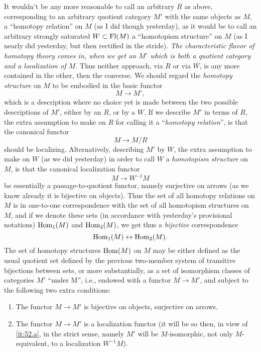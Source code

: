 It wouldn't be any more reasonable to call an arbitrary $R$ as above,
corresponding to an arbitrary quotient category $M'$ with the same
objects as $M$, a ``homotopy relation'' on $M$ (as I did though
yesterday), as it would be to call an arbitrary strongly saturated
$W\subset\operatorname{Fl}(M)$ a ``homotopism structure'' on $M$ (as I nearly did
yesterday, but then rectified in the stride). \emph{The characteristic
  flavor of homotopy theory comes in, when we get an $M'$ which is
  \emph{both} a quotient category and a localization of $M$.} Thus
neither approach, via $R$ or via $W$, is any more contained in the
other, then the converse. We should regard the \emph{homotopy
  structure} on $M$ to be embodied in the basic functor
\[M\to M',\]
which is a description where no choice yet is made between the two
possible descriptions of $M'$, either by an $R$, or by a $W$. If we
describe $M'$ in terms of $R$, the extra assumption to make on $R$ for
calling it a ``\emph{homotopy relation}'', is that the canonical
functor
\[ M \to M/R\]
should be localizing. Alternatively, describing $M'$ by $W$, the extra
assumption to make on $W$ (as we did yesterday) in order to call $W$ a
\emph{homotopism structure} on $M$, is that the canonical localization
functor
\[ M \to W^{-1}M\]
be essentially a passage-to-quotient functor, namely surjective on
arrows (as we know already it is bijective on objects). Thus the set
of all homotopy relations on $M$ is in one-to-one correspondence with
the set of all homotopism structures on $M$, and if we denote these
sets (in accordance with yesterday's provisional notations)
$\operatorname{Hom}_1(M)$ and $\operatorname{Hom}_2(M)$, we get thus a \emph{bijective}
correspondence
\[ \operatorname{Hom}_1(M) \leftrightarrow \operatorname{Hom}_2(M).\]
The set of homotopy structures $\operatorname{Hom}(M)$ on $M$ may be either defined
as the usual quotient set defined by the previous two-member system of
transitive bijections between sets, or more substantially, as a set of
isomorphism classes of categories $M'$ ``under M'', i.e., endowed with
a functor $M\to M'$, and subject to the following two extra
conditions:
\begin{enumerate}[label=\alph*)]
\item\label{it:52.a}
  The functor $M\to M'$ is bijective on objects,
  surjective on arrows.
\item\label{it:52.b}
  The functor $M\to M'$ is a localization functor (it will be so then,
  in view of \ref{it:52.a}, in the strict sense, namely $M'$ will be
  $M$-isomorphic, not only $M$-equivalent, to a localization $W^{-1}M$).
\end{enumerate}

